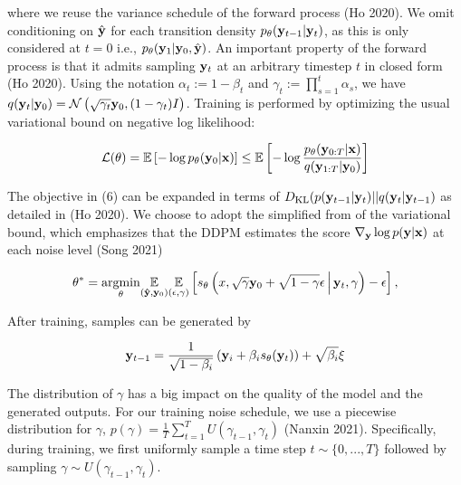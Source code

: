 \documentclass{article}
\begin{document}
where we reuse the variance schedule of the forward process (Ho 2020). We omit conditioning on $\hat{\bold{y}}$ for each transition density $p_{\theta}(\bold{y}_{t-1}|\bold{y}_{t})$, as this is only considered at $t=0$ i.e., $p_{\theta}(\bold{y}_{1}|\bold{y}_{0},\hat{\bold{y}})$. An important property of the forward process is that it admits sampling $\bold{y}_t$ at an arbitrary timestep $t$ in closed form (Ho 2020). Using the notation $\alpha_t := 1 - \beta_t$ and $\gamma_t := \prod_{s=1}^{t} \alpha_s$, we have $q(\bold{y}_t|\bold{y}_0) = \mathcal{N} \left(\sqrt{\gamma_{t}} \bold{y}_{0}, (1 - \gamma_t)I \right)$. Training is performed by optimizing the usual variational bound on negative log likelihood:

\begin{equation}
\mathcal{L}(\theta) = \mathbb{E}\left[-\log p_{\theta}(\bold{y}_{0}|\bold{x})\right] \leq  \mathbb{E}\left[-\log \frac{p_{\theta}(\bold{y}_{0:T}|\bold{x})}{q(\bold{y}_{1:T}|\bold{y}_{0})}\right]
\end{equation}

The objective in (6) can be expanded in terms of $D_{\mathrm{KL}}(p(\bold{y}_{t-1}|\bold{y}_{t})|| q(\bold{y}_{t}|\bold{y}_{t-1})$ as detailed in (Ho 2020). We choose to adopt the simplified from of the variational bound, which emphasizes that the DDPM estimates the score $\nabla_{\bold{y}}\log p(\bold{y}|\bold{x})$ at each noise level (Song 2021)

\begin{equation}
\theta^{*} = \underset{\theta}{\mathrm{argmin}} \underset{(\bold{\hat{y}},\bold{y}_{0})}{\mathbb{E}}\underset{(\epsilon,\gamma)}{\mathbb{E}} \left[ s_{\theta}\left(x, \sqrt{\gamma} \bold{y}_0 + \sqrt{1 - \gamma} \epsilon \, \middle|\, \bold{y}_{t}, \gamma\right) - \epsilon \right],
\end{equation}

After training, samples can be generated by 

\begin{equation}
\bold{y}_{t-1} = \frac{1}{\sqrt{1-\beta_{i}}}\left(\bold{y}_{i} + \beta_{i}s_{\theta}(\bold{y}_{t})\right) + \sqrt{\beta_{i}}\bold{\xi}
\end{equation}

The distribution of $\gamma$ has a big impact on the quality of the model and the generated outputs. For our training noise schedule, we use a piecewise distribution for $\gamma$, $p(\gamma) = \frac{1}{T}\sum_{t=1}^{T} U(\gamma_{t-1}, \gamma_t)$ (Nanxin 2021). Specifically, during training, we first uniformly sample a time step $t \sim \{0, ..., T\}$ followed by sampling $\gamma \sim U(\gamma_{t-1}, \gamma_t)$.
\end{document}
